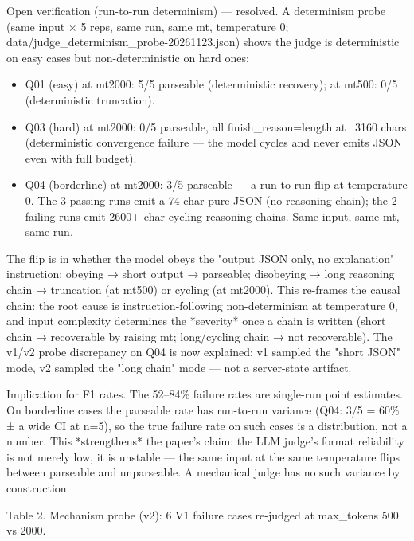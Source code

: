 \documentclass[10pt,twocolumn]{article}
\begin{document}
Open verification (run-to-run determinism) — resolved. A determinism probe (same input × 5 reps, same run, same mt, temperature 0; data/judge\_determinism\_probe-20261123.json) shows the judge is deterministic on easy cases but non-deterministic on hard ones:


\begin{itemize}
  \item Q01 (easy) at mt2000: 5/5 parseable (deterministic recovery); at mt500: 0/5 (deterministic truncation).
  \item Q03 (hard) at mt2000: 0/5 parseable, all finish\_reason=length at ~3160 chars (deterministic convergence failure — the model cycles and never emits JSON even with full budget).
  \item Q04 (borderline) at mt2000: 3/5 parseable — a run-to-run flip at temperature 0. The 3 passing runs emit a 74-char pure JSON (no reasoning chain); the 2 failing runs emit 2600+ char cycling reasoning chains. Same input, same mt, same run.
\end{itemize}


The flip is in whether the model obeys the "output JSON only, no explanation" instruction: obeying → short output → parseable; disobeying → long reasoning chain → truncation (at mt500) or cycling (at mt2000). This re-frames the causal chain: the root cause is instruction-following non-determinism at temperature 0, and input complexity determines the *severity* once a chain is written (short chain → recoverable by raising mt; long/cycling chain → not recoverable). The v1/v2 probe discrepancy on Q04 is now explained: v1 sampled the "short JSON" mode, v2 sampled the "long chain" mode — not a server-state artifact.


Implication for F1 rates. The 52–84\% failure rates are single-run point estimates. On borderline cases the parseable rate has run-to-run variance (Q04: 3/5 = 60\% ± a wide CI at n=5), so the true failure rate on such cases is a distribution, not a number. This *strengthens* the paper's claim: the LLM judge's format reliability is not merely low, it is unstable — the same input at the same temperature flips between parseable and unparseable. A mechanical judge has no such variance by construction.


Table 2. Mechanism probe (v2): 6 V1 failure cases re-judged at max\_tokens 500 vs 2000.
\end{document}
